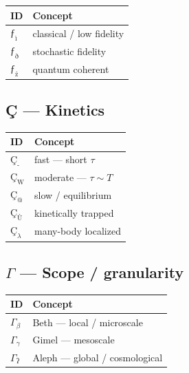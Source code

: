 \documentclass[12pt,a4paper]{article}
\begin{document}
\begin{table}[htbp]
\centering
\small
{}
\begin{tabularx}{\textwidth}{>{\centering\arraybackslash}X >{\centering\arraybackslash}X}
\toprule
\rowcolor{gray!25}\textbf{ID} & \textbf{Concept} \\
\midrule
\rowcolors{1}{white}{gray!10}
$ƒ_{\text{ì}}$ & classical / low fidelity \\
$ƒ_{\text{ð}}$ & stochastic fidelity \\
$ƒ_{\text{ż}}$ & quantum coherent \\
\bottomrule
\end{tabularx}
\end{table}

\subsection{Ç --- Kinetics}

\begin{table}[htbp]
\centering
\small
{}
\begin{tabularx}{\textwidth}{>{\centering\arraybackslash}X >{\centering\arraybackslash}X}
\toprule
\rowcolor{gray!25}\textbf{ID} & \textbf{Concept} \\
\midrule
\rowcolors{1}{white}{gray!10}
$Ç_{\text{-}}$ & fast --- short $\tau$ \\
$Ç_{\text{W}}$ & moderate --- $\tau \sim T$ \\
$Ç_{\text{@}}$ & slow / equilibrium \\
$Ç_{\text{Ù}}$ & kinetically trapped \\
$Ç_{\lambda}$ & many-body localized \\
\bottomrule
\end{tabularx}
\end{table}

\subsection{$\Gamma$ --- Scope / granularity}

\begin{table}[htbp]
\centering
\small
{}
\begin{tabularx}{\textwidth}{>{\centering\arraybackslash}X >{\centering\arraybackslash}X}
\toprule
\rowcolor{gray!25}\textbf{ID} & \textbf{Concept} \\
\midrule
\rowcolors{1}{white}{gray!10}
$\Gamma_{\beta}$ & Beth --- local / microscale \\
$\Gamma_{\gamma}$ & Gimel --- mesoscale \\
$\Gamma_{\text{ʔ}}$ & Aleph --- global / cosmological \\
\bottomrule
\end{tabularx}
\end{table}
\end{document}
